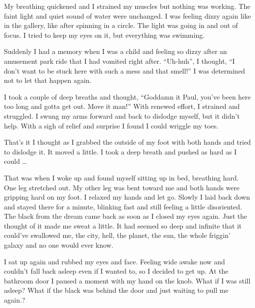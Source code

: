 My breathing quickened and I strained my muscles but nothing was
working. The faint light and quiet sound of water were
unchanged. I was feeling dizzy again like in the gallery, like
after spinning in a circle. The light was going in and out of
focus. I tried to keep my eyes on it, but everything was
swimming.

Suddenly I had a memory when I was a child and feeling so dizzy
after an amusement park ride that I had vomited right after.
``Uh-huh'', I thought, ``I don't want to be stuck here with such
a mess and that smell!''  I was determined not to let that
happen again.

I took a couple of deep breaths and thought, ``Goddamn it Paul,
you've been here too long and gotta get out. Move it man!'' With
renewed effort, I strained and struggled. I swung my arms
forward and back to dislodge myself, but it didn't help.  With a
sigh of relief and surprise I found I could wriggle my toes.

That's it I thought as I grabbed the outside of my foot with
both hands and tried to dislodge it. It moved a little. I took a
deep breath and pushed as hard as I could \ldots


\subsectsep

That was when I woke up and found myself sitting up in bed,
breathing hard. One leg stretched out. My other leg was bent
toward me and both hands were gripping hard on my foot. I
relaxed my hands and let go.  Slowly I laid back down and stayed
there for a minute, blinking fast and still feeling a little
disoriented.  The black from the dream came back as soon as I
closed my eyes again. Just the thought of it made me sweat a
little. It had seemed so deep and infinite that it could've
swallowed me, the city, hell, the planet, the sun, the whole
friggin' galaxy and no one would ever know.

I sat up again and rubbed my eyes and face.  Feeling wide awake
now and couldn't fall back asleep even if I wanted to, so I
decided to get up.  At the bathroom door I paused a moment with
my hand on the knob. What if I was still asleep? What if the
black was behind the door and just waiting to pull me again.?

